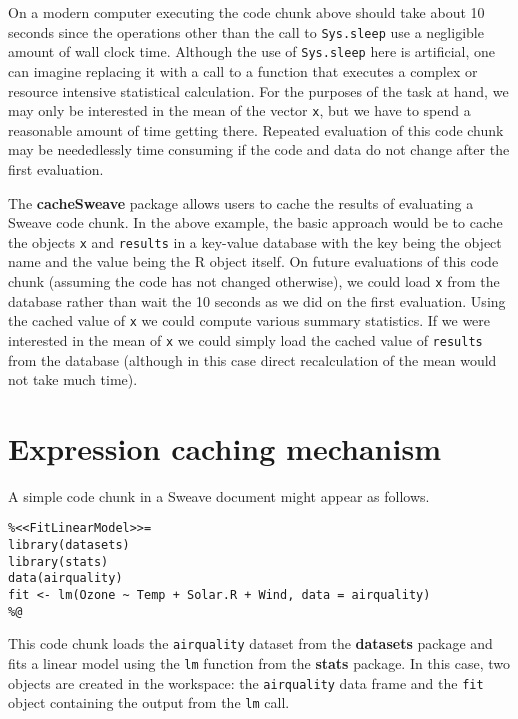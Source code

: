 \documentclass{article}
\newcommand{\proglang}{\textsf}
\newcommand{\code}{\texttt}
\newcommand{\pkg}{\textbf}
\begin{document}
On a modern computer executing the code chunk above should take about
10 seconds since the operations other than the call to
\code{Sys.sleep} use a negligible amount of wall clock time.  Although
the use of \code{Sys.sleep} here is artificial, one can imagine
replacing it with a call to a function that executes a complex or
resource intensive statistical calculation.  For the purposes of the
task at hand, we may only be interested in the mean of the vector
\code{x}, but we have to spend a reasonable amount of time getting
there.  Repeated evaluation of this code chunk may be neededlessly
time consuming if the code and data do not change after the first
evaluation.

The \pkg{cacheSweave} package allows users to cache the results of
evaluating a Sweave code chunk.  In the above example, the basic
approach would be to cache the objects \code{x} and \code{results} in
a key-value database with the key being the object name and the value
being the \proglang{R} object itself.  On future evaluations of this
code chunk (assuming the code has not changed otherwise), we could
load \code{x} from the database rather than wait the 10 seconds as we
did on the first evaluation.  Using the cached value of \code{x} we
could compute various summary statistics.  If we were interested in
the mean of \code{x} we could simply load the cached value of
\code{results} from the database (although in this case direct
recalculation of the mean would not take much time).


\section{Expression caching mechanism}

A simple code chunk in a Sweave document might appear as follows.
\begin{verbatim}
%<<FitLinearModel>>=
library(datasets)
library(stats)
data(airquality)
fit <- lm(Ozone ~ Temp + Solar.R + Wind, data = airquality)
%@
\end{verbatim}
This code chunk loads the \code{airquality} dataset from the
\pkg{datasets} package and fits a linear model using the \code{lm}
function from the \pkg{stats} package.  In this case, two objects are
created in the workspace: the \code{airquality} data frame and the
\code{fit} object containing the output from the \code{lm} call.
\end{document}
